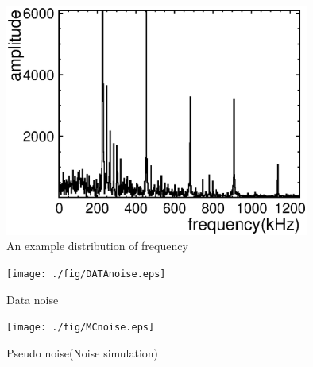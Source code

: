 \begin{figure}[!htb]
  \centering
  \centering
  \includegraphics[width=10cm,clip]{./fig/FFTdist.eps}
  \caption{An example distribution of frequency}
  \label{example10ch}
\end{figure}
\begin{figure}[!htb]
\begin{minipage}{0.5\hsize}
  \centering
  \texttt{[image: ./fig/DATAnoise.eps]}
  \caption{Data noise}
  \label{DATAnoise}
\end{minipage}
\begin{minipage}{0.5\hsize}
  \centering
  \texttt{[image: ./fig/MCnoise.eps]}
  \caption{Pseudo noise(Noise simulation)}
  \label{MCnoise}
\end{minipage}
\end{figure}
